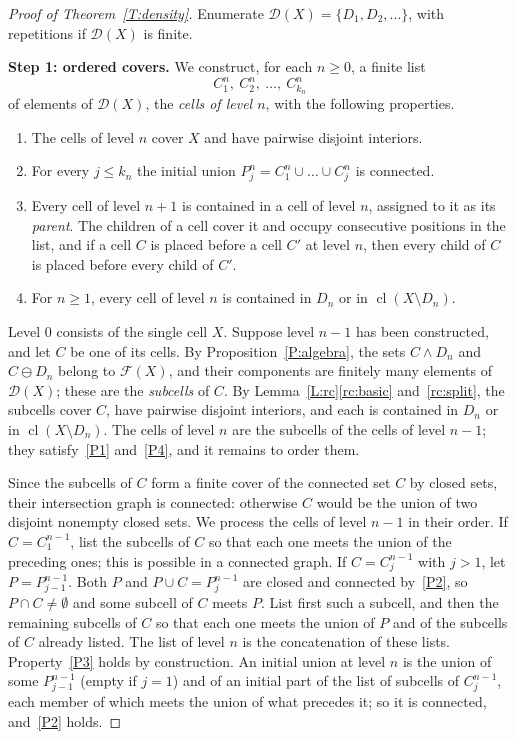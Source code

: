 \documentclass[11pt,reqno]{amsart}
\theoremstyle{plain}
\theoremstyle{definition}
\theoremstyle{remark}
\newcommand{\D}{\mathcal{D}}
\newcommand{\F}{\mathscr{F}}
\newcommand{\cl}{\operatorname{cl}}
\newcommand{\rd}{\ominus}
\begin{document}
\begin{proof}[Proof of Theorem~\ref{T:density}]
Enumerate $\D(X)=\{D_1,D_2,\dots\}$, with repetitions if $\D(X)$ is finite.

\medskip
\noindent\textbf{Step 1: ordered covers.} We construct, for each $n\ge0$, a finite list
\[
C^n_1,\ C^n_2,\ \dots,\ C^n_{k_n}
\]
of elements of $\D(X)$, the \emph{cells of level $n$}, with the following properties.
\begin{enumerate}[label=\textup{(P\arabic*)}]
\item\label{P1} The cells of level $n$ cover $X$ and have pairwise disjoint interiors.
\item\label{P2} For every $j\le k_n$ the initial union $P^n_j=C^n_1\cup\dots\cup C^n_j$ is connected.
\item\label{P3} Every cell of level $n+1$ is contained in a cell of level $n$, assigned to it as its \emph{parent}. The children of a cell cover it and occupy consecutive positions in the list, and if a cell $C$ is placed before a cell $C'$ at level $n$, then every child of $C$ is placed before every child of $C'$.
\item\label{P4} For $n\ge1$, every cell of level $n$ is contained in $D_n$ or in $\cl(X\setminus D_n)$.
\end{enumerate}
Level $0$ consists of the single cell $X$. Suppose level $n-1$ has been constructed, and let $C$ be one of its cells. By Proposition~\ref{P:algebra}, the sets $C\wedge D_n$ and $C\rd D_n$ belong to $\F(X)$, and their components are finitely many elements of $\D(X)$; these are the \emph{subcells} of $C$. By Lemma~\ref{L:rc}\ref{rc:basic} and~\ref{rc:split}, the subcells cover $C$, have pairwise disjoint interiors, and each is contained in $D_n$ or in $\cl(X\setminus D_n)$. The cells of level $n$ are the subcells of the cells of level $n-1$; they satisfy~\ref{P1} and~\ref{P4}, and it remains to order them.

Since the subcells of $C$ form a finite cover of the connected set $C$ by closed sets, their intersection graph is connected: otherwise $C$ would be the union of two disjoint nonempty closed sets. We process the cells of level $n-1$ in their order. If $C=C^{n-1}_1$, list the subcells of $C$ so that each one meets the union of the preceding ones; this is possible in a connected graph. If $C=C^{n-1}_j$ with $j>1$, let $P=P^{n-1}_{j-1}$. Both $P$ and $P\cup C=P^{n-1}_j$ are closed and connected by~\ref{P2}, so $P\cap C\neq\emptyset$ and some subcell of $C$ meets $P$. List first such a subcell, and then the remaining subcells of $C$ so that each one meets the union of $P$ and of the subcells of $C$ already listed. The list of level $n$ is the concatenation of these lists. Property~\ref{P3} holds by construction. An initial union at level $n$ is the union of some $P^{n-1}_{j-1}$ (empty if $j=1$) and of an initial part of the list of subcells of $C^{n-1}_j$, each member of which meets the union of what precedes it; so it is connected, and~\ref{P2} holds.


\end{proof}
\end{document}
